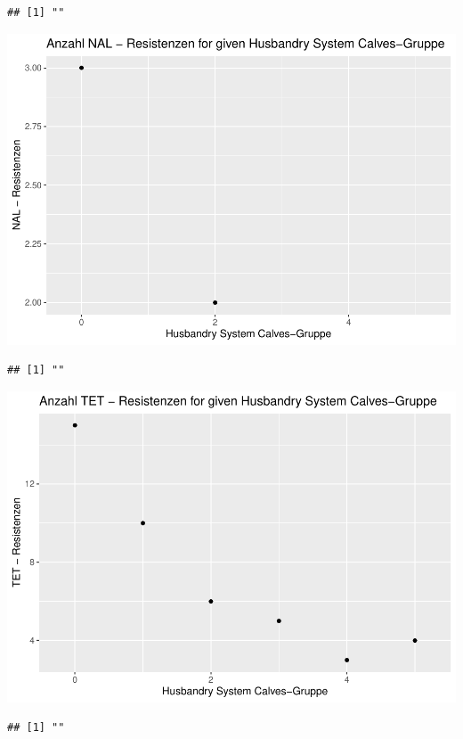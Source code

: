 \documentclass[
]{article}
\begin{document}
\begin{verbatim}
## [1] ""
\end{verbatim}

\includegraphics{NResistenzen_files/figure-latex/binary_or_nominal_variables-37.pdf}

\begin{verbatim}
## [1] ""
\end{verbatim}

\includegraphics{NResistenzen_files/figure-latex/binary_or_nominal_variables-38.pdf}

\begin{verbatim}
## [1] ""
\end{verbatim}
\end{document}
